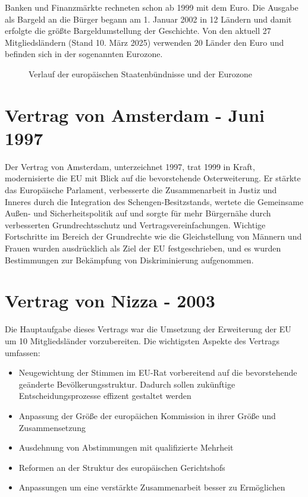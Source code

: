 \documentclass[12pt, oneside]{book} %
\begin{document}
Banken und Finanzmärkte rechneten schon ab 1999 mit dem Euro. Die Ausgabe als Bargeld an die Bürger begann am 1. Januar 2002 in 12 Ländern und damit erfolgte die größte Bargeldumstellung der Geschichte. Von den aktuell 27 Mitgliedsländern (Stand 10. März 2025) verwenden 20 Länder den Euro und befinden sich in der sogenannten Eurozone.

\begin{figure}[htbp]
    \centering
    \caption{Verlauf der europäischen Staatenbündnisse und der Eurozone}
    \label{fig:subfigure}
\end{figure}

\section{Vertrag von Amsterdam - Juni 1997}
Der Vertrag von Amsterdam, unterzeichnet 1997, trat 1999 in Kraft, modernisierte die EU mit Blick auf die bevorstehende Osterweiterung. Er stärkte das Europäische Parlament, verbesserte die Zusammenarbeit in Justiz und Inneres durch die Integration des Schengen-Besitzstands, wertete die Gemeinsame Außen- und Sicherheitspolitik auf und sorgte für mehr Bürgernähe durch verbesserten Grundrechtsschutz und Vertragsvereinfachungen. Wichtige Fortschritte im Bereich der Grundrechte wie die Gleichstellung von Männern und Frauen wurden ausdrücklich als Ziel der EU festgeschrieben, und es wurden Bestimmungen zur Bekämpfung von Diskriminierung aufgenommen.

\vspace{1cm}

\section{Vertrag von Nizza - 2003}
Die Hauptaufgabe dieses Vertrags war die Umsetzung der Erweiterung der EU um 10 Mitgliedsländer vorzubereiten. 
Die wichtigsten Aspekte des Vertrags umfassen:


\begin{description}
    \item[]
\end{description}


\begin{itemize}
    \item Neugewichtung der Stimmen im EU-Rat vorbereitend auf die bevorstehende geänderte Bevölkerungsstruktur. Dadurch sollen zukünftige Entscheidungsprozesse effizent gestaltet werden
    \item Anpassung der Größe der europäichen Kommission in ihrer Größe und Zusammensetzung
    \item Ausdehnung von Abstimmungen mit qualifizierte Mehrheit
    \item Reformen an der Struktur des europäischen Gerichtshofs
    \item Anpassungen um eine verstärkte Zusammenarbeit besser zu Ermöglichen
\end{itemize}
\end{document}
